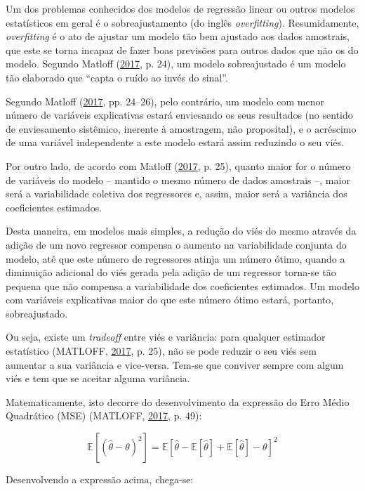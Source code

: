 \documentclass[a4paper, 12pt]{article}
\begin{document}
Um dos problemas conhecidos dos modelos de regressão linear ou outros
modelos estatísticos em geral é o sobreajustamento (do inglês
\emph{overfitting}). Resumidamente, \emph{overfitting} é o ato de
ajustar um modelo tão bem ajustado aos dados amostrais, que este se
torna incapaz de fazer boas previsões para outros dados que não os do
modelo. Segundo Matloff (\protect\hyperlink{ref-matloff2017}{2017}, p.
24), um modelo sobreajustado é um modelo tão elaborado que ``capta o
ruído ao invés do sinal''.

Segundo Matloff (\protect\hyperlink{ref-matloff2017}{2017}, pp. 24--26),
pelo contrário, um modelo com menor número de variáveis explicativas
estará enviesando os seus resultados (no sentido de enviesamento
sistêmico, inerente à amostragem, não proposital), e o acréscimo de uma
variável independente a este modelo estará assim reduzindo o seu viés.

Por outro lado, de acordo com Matloff
(\protect\hyperlink{ref-matloff2017}{2017}, p. 25), quanto maior for o
número de variáveis do modelo -- mantido o mesmo número de dados
amostrais --, maior será a variabilidade coletiva dos regressores e,
assim, maior será a variância dos coeficientes estimados.

Desta maneira, em modelos mais simples, a redução do viés do mesmo
através da adição de um novo regressor compensa o aumento na
variabilidade conjunta do modelo, até que este número de regressores
atinja um número ótimo, quando a diminuição adicional do viés gerada
pela adição de um regressor torna-se tão pequena que não compensa a
variabilidade dos coeficientes estimados. Um modelo com variáveis
explicativas maior do que este número ótimo estará, portanto,
sobreajustado.

Ou seja, existe um \emph{tradeoff} entre viés e variância: para qualquer
estimador estatístico (MATLOFF,
\protect\hyperlink{ref-matloff2017}{2017}, p. 25), não se pode reduzir o
seu viés sem aumentar a sua variância e vice-versa. Tem-se que conviver
sempre com algum viés e tem que se aceitar alguma variância.

Matematicamente, isto decorre do desenvolvimento da expressão do Erro
Médio Quadrático (MSE) (MATLOFF,
\protect\hyperlink{ref-matloff2017}{2017}, p. 49):

\[\mathbb{E}[(\hat{\theta} - \theta)^2] = \mathbb{E}[\hat{\theta} - \mathbb{E}[\hat{\theta}] + \mathbb{E}[\hat{\theta}] - \theta]^2\]

Desenvolvendo a expressão acima, chega-se:
\end{document}
